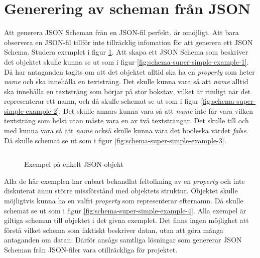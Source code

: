 \section{Generering av scheman från JSON}
\label{sec:forarbete:json-till-schema}
Att generera JSON Scheman från en JSON-fil perfekt, är omöjligt. Att bara observera en JSON-fil tillför inte tillräcklig infomation för att generera ett JSON Schema. Studera exemplet i figur \ref{fig:json-super-simple-example}. Att skapa ett JSON Schema som beskriver det objektet skulle kunna se ut som i figur \ref{fig:schema-super-simple-example-1}. Då har antaganden tagits om att det objektet alltid ska ha en \textit{property} som heter \textit{name} och ska innehålla en textsträng. Det skulle kunna vara så att \textit{name} alltid ska innehålla en textsträng som börjar på stor bokstav, vilket är rimligt när det representerar ett namn, och då skulle schemat se ut som i figur \ref{fig:schema-super-simple-example-2}. Det skulle annars kunna vara så att \textit{name} inte får vara vilken textsträng som helst utan måste vara en av två textsträngar. Det skulle till och med kunna vara så att \textit{name} också skulle kunna vara det booleska värdet \textit{false}. Då skulle schemat se ut som i figur \ref{fig:schema-super-simple-example-3}.

\begin{figure}
	\inputminted[tabsize=2, frame=single, fontsize=\small, framesep=2mm]{json}{code/schema-generation-example/json-file.json}
	\vspace{-1.7em}
	\caption{Exempel på enkelt JSON-objekt}
	\label{fig:json-super-simple-example}
\end{figure}

Alla de här exemplen har enbart behandlat feltolkning av en \textit{property} och inte diskuterat ännu större missförstånd med objektets struktur. Objektet skulle möjligtvis kunna ha en valfri \textit{property} som representerar efternamn. Då skulle schemat se ut som i figur \ref{fig:schema-super-simple-example-4}. Alla exempel är giltiga scheman till objektet i det givna exemplet. Det finns ingen möjlighet att förstå vilket schema som faktiskt beskriver datan, utan att göra många antaganden om datan. Därför ansågs samtliga lösningar som genererar JSON Scheman från JSON-filer vara otillräckliga för projektet.

